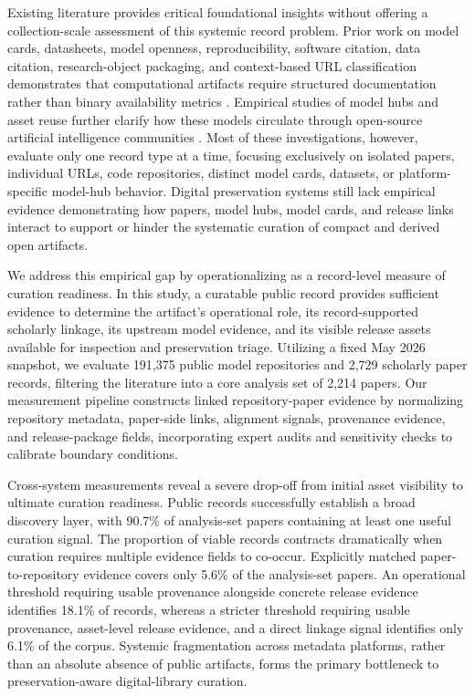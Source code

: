 Existing literature provides critical foundational insights without offering a collection-scale assessment of this systemic record problem. Prior work on model cards, datasheets, model openness, reproducibility, software citation, data citation, research-object packaging, and context-based URL classification demonstrates that computational artifacts require structured documentation rather than binary availability metrics \cite{gebru2021datasheets,mitchell2019modelcards,pineau2021reproducibility,bommasani2023fmi,white2024mof,salsabil2025context}. Empirical studies of model hubs and asset reuse further clarify how these models circulate through open-source artificial intelligence communities \cite{jiang2023ptmreuse,taraghi2024modelreuse,osborne2024aicommunity}. Most of these investigations, however, evaluate only one record type at a time, focusing exclusively on isolated papers, individual URLs, code repositories, distinct model cards, datasets, or platform-specific model-hub behavior. Digital preservation systems still lack empirical evidence demonstrating how papers, model hubs, model cards, and release links interact to support or hinder the systematic curation of compact and derived open \llm artifacts.

We address this empirical gap by operationalizing \curatability as a record-level measure of curation readiness. In this study, a curatable public record provides sufficient evidence to determine the artifact's operational role, its record-supported scholarly linkage, its upstream model evidence, and its visible release assets available for inspection and preservation triage. Utilizing a fixed May 2026 snapshot, we evaluate 191,375 public \hf model repositories and 2,729 scholarly paper records, filtering the literature into a core analysis set of 2,214 papers. Our measurement pipeline constructs linked repository-paper evidence by normalizing repository metadata, paper-side links, alignment signals, provenance evidence, and release-package fields, incorporating expert audits and sensitivity checks to calibrate boundary conditions.

Cross-system measurements reveal a severe drop-off from initial asset visibility to ultimate curation readiness. Public records successfully establish a broad discovery layer, with 90.7\% of analysis-set papers containing at least one useful curation signal. The proportion of viable records contracts dramatically when curation requires multiple evidence fields to co-occur. Explicitly matched paper-to-\hf repository evidence covers only 5.6\% of the analysis-set papers. An operational threshold requiring usable provenance alongside concrete release evidence identifies 18.1\% of records, whereas a stricter threshold requiring usable provenance, asset-level release evidence, and a direct linkage signal identifies only 6.1\% of the corpus. Systemic fragmentation across metadata platforms, rather than an absolute absence of public artifacts, forms the primary bottleneck to preservation-aware digital-library curation.

